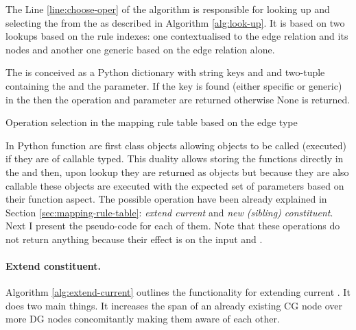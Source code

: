 The Line \ref{line:choose-oper} of the algorithm is responsible for looking up and selecting the \operation from the \rt as described in Algorithm \ref{alg:look-up}. It is based on two lookups based on the rule indexes: one contextualised to the edge relation and its nodes and another one generic based on the edge relation alone.

The \rt is conceived as a Python dictionary with string keys and and two-tuple containing the \operation and the \elementType parameter. If the key is found (either specific or generic) in the \rt then the operation and parameter are returned otherwise None is returned. 

\begin{algorithm}[H]
\Input{ \rt, \edge}
\Output{ \rrule}
	\caption{Operation selection in the mapping rule table based on the edge type}
	\label{alg:look-up}
\end{algorithm}

In Python function are first class objects allowing objects to be called (executed) if they are of callable typed. This duality allows storing the functions directly in the \rt and then, upon lookup they are returned as objects but because they are also callable these objects are executed with the expected set of parameters based on their function aspect. The possible operation have been already explained in Section \ref{sec:mapping-rule-table}: \textit{extend current} and \textit{new (sibling) constituent}. Next I present the pseudo-code for each of them. Note that these operations do not return anything because their effect is on the input \cg and \dg. 

\paragraph{Extend constituent.} Algorithm \ref{alg:extend-current} outlines the functionality for extending current \cgPointer. It does two main things. It increases the span of an already existing CG node over more DG nodes concomitantly making them aware of each other. 

